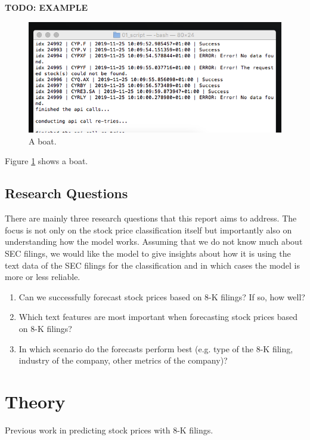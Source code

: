 \documentclass{article}
\begin{document}
	\textbf{TODO: EXAMPLE}

	\begin{figure}[h]
		\includegraphics[width=\linewidth]{img/test.png}
		\caption{A boat.}
		\label{fig:boat1}
	\end{figure}
	
	Figure \ref{fig:boat1} shows a boat.
	
	
	\subsection{Research Questions}
	
	There are mainly three research questions that this report aims to address. The focus is not only on the stock price classification itself but importantly also on understanding how the model works. Assuming that we do not know much about SEC filings, we would like the model to give insights about how it is using the text data of the SEC filings for the classification and in which cases the model is more or less reliable. 
	
	\begin{enumerate}
		\item Can we successfully forecast stock prices based on 8-K filings? If so, how well?
		\item Which text features are most important when forecasting stock prices based on 8-K filings?
		\item In which scenario do the forecasts perform best (e.g. type of the 8-K filing, industry of the company, other metrics of the company)?
	\end{enumerate}
	

	\section{Theory}
	
	Previous work in predicting stock prices with 8-K filings.
	
\end{document}
